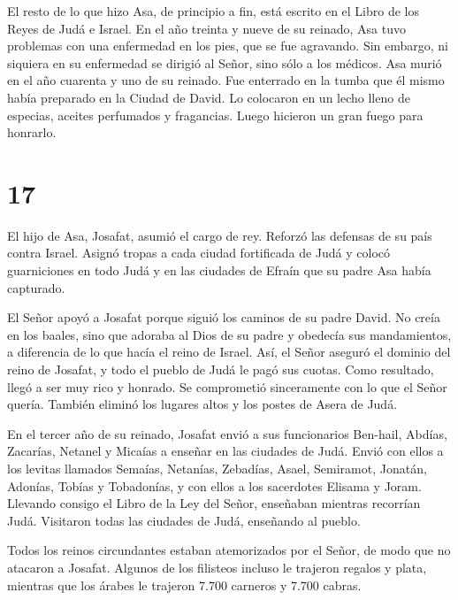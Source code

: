  El resto de lo que hizo Asa, de principio a fin, está
escrito en el Libro de los Reyes de Judá e Israel.  En el
año treinta y nueve de su reinado, Asa tuvo problemas con una enfermedad
en los pies, que se fue agravando. Sin embargo, ni siquiera en su
enfermedad se dirigió al Señor, sino sólo a los médicos. 
Asa murió en el año cuarenta y uno de su reinado.  Fue
enterrado en la tumba que él mismo había preparado en la Ciudad de
David. Lo colocaron en un lecho lleno de especias, aceites perfumados y
fragancias. Luego hicieron un gran fuego para honrarlo.

\hypertarget{section-16}{%
\section{17}\label{section-16}}

 El hijo de Asa, Josafat, asumió el cargo de rey. Reforzó
las defensas de su país contra Israel.  Asignó tropas a cada
ciudad fortificada de Judá y colocó guarniciones en todo Judá y en las
ciudades de Efraín que su padre Asa había capturado.

 El Señor apoyó a Josafat porque siguió los caminos de su
padre David. No creía en los baales,  sino que adoraba al
Dios de su padre y obedecía sus mandamientos, a diferencia de lo que
hacía el reino de Israel.  Así, el Señor aseguró el dominio
del reino de Josafat, y todo el pueblo de Judá le pagó sus cuotas. Como
resultado, llegó a ser muy rico y honrado.  Se comprometió
sinceramente con lo que el Señor quería. También eliminó los lugares
altos y los postes de Asera de Judá.

 En el tercer año de su reinado, Josafat envió a sus
funcionarios Ben-hail, Abdías, Zacarías, Netanel y Micaías a enseñar en
las ciudades de Judá.  Envió con ellos a los levitas
llamados Semaías, Netanías, Zebadías, Asael, Semiramot, Jonatán,
Adonías, Tobías y Tobadonías, y con ellos a los sacerdotes Elisama y
Joram.  Llevando consigo el Libro de la Ley del Señor,
enseñaban mientras recorrían Judá. Visitaron todas las ciudades de Judá,
enseñando al pueblo.

 Todos los reinos circundantes estaban atemorizados por el
Señor, de modo que no atacaron a Josafat.  Algunos de los
filisteos incluso le trajeron regalos y plata, mientras que los árabes
le trajeron 7.700 carneros y 7.700 cabras.


